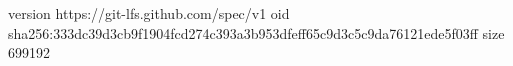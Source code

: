 version https://git-lfs.github.com/spec/v1
oid sha256:333dc39d3cb9f1904fcd274c393a3b953dfeff65c9d3c5c9da76121ede5f03ff
size 699192
